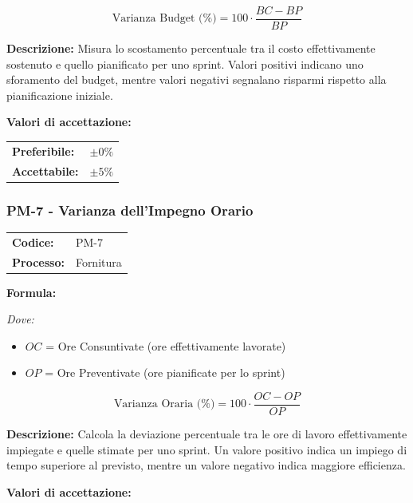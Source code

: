 \documentclass[a4paper,11pt,oneside]{scrartcl}
\begin{document}
\[
    \text{Varianza Budget (\%)} = 100 \cdot \frac{BC - BP}{BP}
\]

\noindent\textbf{Descrizione:} Misura lo scostamento percentuale tra il costo effettivamente sostenuto e quello pianificato per uno sprint. Valori positivi indicano uno sforamento del budget, mentre valori negativi segnalano risparmi rispetto alla pianificazione iniziale.

\vspace{0.2cm}
\noindent\textbf{Valori di accettazione:}
\vspace{0.1cm}

\noindent
\begin{tabular}{@{}ll@{}}
    \textbf{Preferibile:} & $\pm 0\%$ \\
    \textbf{Accettabile:} & $\pm 5\%$ \\
\end{tabular}

\subsubsection{PM-7 - Varianza dell'Impegno Orario}

\noindent
\begin{tabular}{@{}p{}p{}@{}}
    \textbf{Codice:}   & PM-7      \\
    \textbf{Processo:} & Fornitura \\
\end{tabular}

\vspace{0.3cm}
\noindent\textbf{Formula:}

\noindent\textit{Dove:}
\begin{itemize}[leftmargin=1.5cm, topsep=0pt, itemsep=0pt]
    \item $OC$ = Ore Consuntivate (ore effettivamente lavorate)
    \item $OP$ = Ore Preventivate (ore pianificate per lo sprint)
\end{itemize}

\[
    \text{Varianza Oraria (\%)} = 100 \cdot \frac{OC - OP}{OP}
\]

\noindent\textbf{Descrizione:} Calcola la deviazione percentuale tra le ore di lavoro effettivamente impiegate e quelle stimate per uno sprint. Un valore positivo indica un impiego di tempo superiore al previsto, mentre un valore negativo indica maggiore efficienza.

\vspace{0.2cm}
\noindent\textbf{Valori di accettazione:}
\vspace{0.1cm}
\end{document}
